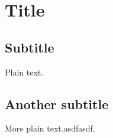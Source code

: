 \documentclass[a4paper,12pt,openany]{report}
\begin{document}


\section{Title}

\subsection{Subtitle}

Plain text.

\subsection{Another subtitle}

More plain text.\cite{book:SAPM}asdfasdf.\cite{book:HA}



\end{document}
